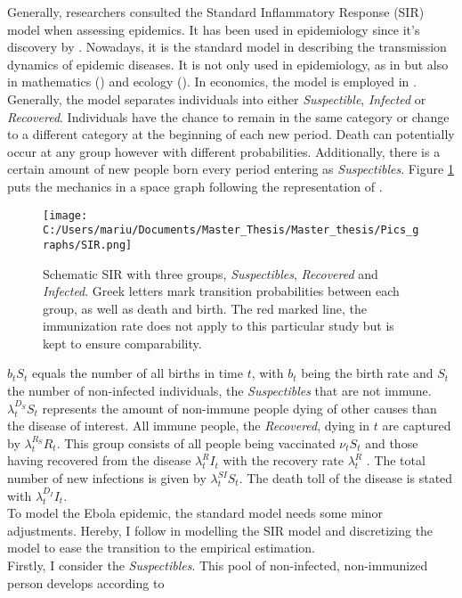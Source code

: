 \documentclass{article}
\begin{document}
Generally, researchers consulted the Standard Inflammatory Response (SIR) model when assessing epidemics. It has been used in epidemiology since it's discovery by \cite{kermack1927contribution}. Nowadays, it is the standard model in describing the transmission dynamics of epidemic diseases. It is not only used in epidemiology, as in \cite{shulgin1998pulse} but also in mathematics (\cite{mccluskey2010complete}) and ecology (\cite{bjornstad2002dynamics}). In economics, the model is employed in \cite{hansen2017preventing}. \\
Generally, the model separates individuals into either \textit{Suspectible}, \textit{Infected} or \textit{Recovered}. Individuals have the chance to remain in the same category or change to a different category at the beginning of each new period. Death can potentially occur at any group however with different probabilities. Additionally, there is a certain amount of new people born every period entering as \textit{Suspectibles}. Figure \ref{Schematic SIR} puts the mechanics in a space graph following the representation of \cite{bhattacharya2013health}.

\begin{figure}[!ht]
\begin{center}
\begin{minipage}[t]{0.8\textwidth}
\caption{ Schematic SIR with three groups, \textit{Suspectibles}, \textit{Recovered} and \textit{Infected}. Greek letters mark transition probabilities between each group, as well as death and birth. The red marked line, the immunization rate does not apply to this particular study but is kept to ensure comparability. \label{Schematic SIR}}
\texttt{[image: C:/Users/mariu/Documents/Master\_Thesis/Master\_thesis/Pics\_graphs/SIR.png]}\\
\end{minipage}
\end{center}
\end{figure}

$b_t S_t$ equals the number of all births in time $t$, with $b_t$ being the birth rate and $S_t$ the number of non-infected individuals, the \textit{Suspectibles} that are not immune. $\lambda_t^{D_S} S_t$ represents the amount of non-immune people dying of other causes than the disease of interest. All immune people, the \textit{Recovered}, dying in $t$ are captured by $\lambda_t^{R_S} R_t$. This group consists of all people being vaccinated $\nu_t S_t$ and those having recovered from the disease $\lambda_t^{R} I_t$ with the recovery rate $\lambda_t^{R}$ . The total number of new infections is given by $\lambda_t^{SI} S_t$. The death toll of the disease is stated with $\lambda_t^{D_I} I_t$. \\
To model the Ebola epidemic, the standard model needs some minor adjustments. Hereby, I follow \cite{hansen2017preventing} in modelling the SIR model and discretizing the model to ease the transition to the empirical estimation. \\
Firstly, I consider the \textit{Suspectibles}. This pool of non-infected, non-immunized person develops according to
\end{document}

